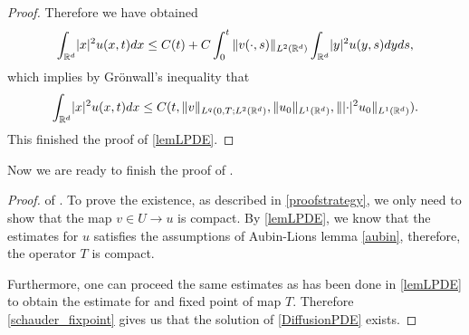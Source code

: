 \begin{proof}
   Therefore we have obtained 
   \begin{align*}
   \int_{\mathbb{R}^{d} } \lvert x\rvert^2 u(x,t) dx \leq C(t)+C \int_0^{t}  \| v (\cdot,s)\|_{L^{2}(\mathbb{R}^d) } \int_{\mathbb{R}^{d} } \lvert y\rvert^2 u(y,s) dy ds,
   \end{align*}
   which implies by Grönwall's inequality that 
   \begin{align*}
   \int_{\mathbb{R}^{d} } \lvert x\rvert^2 u(x,t) dx \leq  C (t,\| v \|_{L^q(0,T;L^{2}(\mathbb{R}^d)},\|u_0\|_{L^{1}(\mathbb{R}^d) }, \|\lvert\cdot\rvert^2u_0\|_{L^{1}(\mathbb{R}^d) } ).
   \end{align*}
This finished the proof of \autoref{lemLPDE}.   
\end{proof}
   
   
   \vskip5mm Now we are ready to finish the proof of .
   \begin{proof} of . To prove the existence, as described in \autoref{proofstrategy}, we only need to show that the map $v\in U\to u$ is compact. By \autoref{lemLPDE}, we know that the estimates for $u$ satisfies the assumptions of Aubin-Lions lemma \eqref{aubin}, therefore, the operator $T$ is compact.
   
   Furthermore, one can proceed the same estimates as has been done in \autoref{lemLPDE} to obtain the estimate for and fixed point of map $T$. Therefore \autoref{schauder_fixpoint} gives us that the solution of \eqref{DiffusionPDE} exists.
   

\end{proof}

